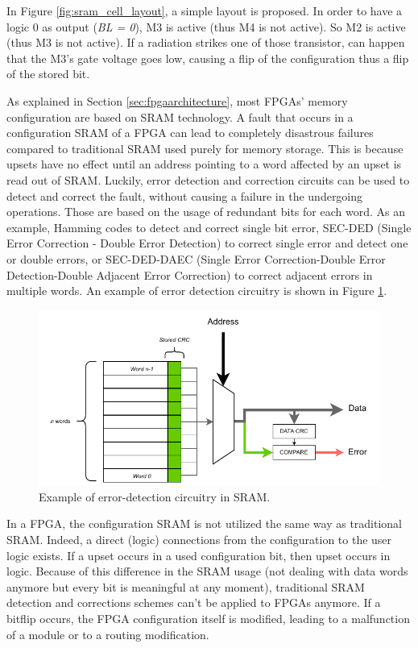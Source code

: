 In Figure \ref{fig:sram_cell_layout}, a simple layout is proposed. In order to have a logic 0 as output (\textit{BL = 0}), M3 is active (thus M4 is not active). So M2 is active (thus M3 is not active). If a radiation strikes one of those transistor, can happen that the M3's gate voltage goes low, causing a flip of the configuration thus a flip of the stored bit. \bigskip

As explained in Section \ref{sec:fpgaarchitecture}, most FPGAs' memory configuration are based on SRAM technology. A fault that occurs in a configuration SRAM of a FPGA can lead to completely disastrous failures compared to traditional SRAM used purely for memory storage. This is because upsets have no effect until an address pointing to a word affected by an upset is read out of SRAM. Luckily, error detection and correction circuits can be used to detect and correct the fault, without causing a failure in the undergoing operations. Those are based on the usage of redundant bits for each word. As an example, Hamming codes to detect and correct single bit error, SEC-DED (Single Error Correction - Double Error Detection) to correct single error and detect one or double errors, or SEC-DED-DAEC \cite{9418432} (Single Error Correction-Double Error Detection-Double Adjacent Error Correction) to correct adjacent errors in multiple words. An example of error detection circuitry is shown in Figure \ref{fig:sram_det}.

\begin{figure}[H]
\centering
\includegraphics[width=1.0\linewidth]{images/chapter2/sram_detect.pdf}
\caption{Example of error-detection circuitry in SRAM.}
\label{fig:sram_det}
\end{figure}

In a FPGA, the configuration SRAM is not utilized the same way as traditional SRAM. Indeed, a direct (logic) connections from the configuration to the user logic exists. If a upset occurs in a used configuration bit, then upset occurs in logic. Because of this difference in the SRAM usage (not dealing with data words anymore but every bit is meaningful at any moment), traditional SRAM detection and corrections schemes can't be applied to FPGAs anymore. If a bitflip occurs, the FPGA configuration itself is modified, leading to a malfunction of a module or to a routing modification.\bigskip

